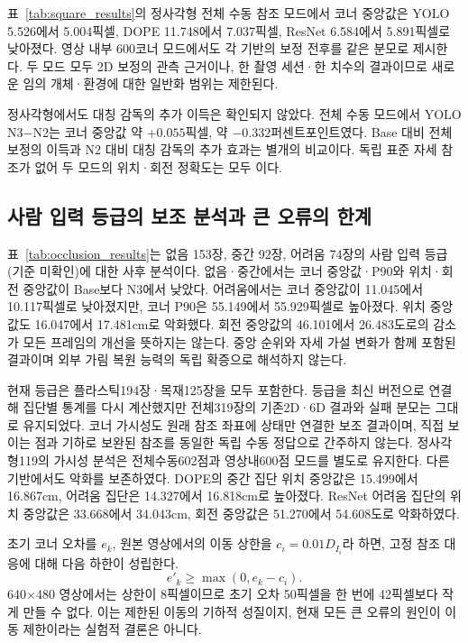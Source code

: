 표~\ref{tab:square_results}의 정사각형 전체 수동 참조 모드에서 코너 중앙값은 YOLO 5.526에서 5.004픽셀, DOPE 11.748에서 7.037픽셀, ResNet 6.584에서 5.891픽셀로 낮아졌다. 영상 내부 600코너 모드에서도 각 기반의 보정 전후를 같은 분모로 제시한다. 두 모드 모두 2D 보정의 관측 근거이나, 한 촬영 세션·한 치수의 결과이므로 새로운 임의 개체·환경에 대한 일반화 범위는 제한된다.


정사각형에서도 대칭 감독의 추가 이득은 확인되지 않았다. 전체 수동 모드에서 YOLO N3−N2는 코너 중앙값 약 $+0.055$픽셀, \pckten 약 $-0.332$퍼센트포인트였다. Base 대비 전체 보정의 이득과 N2 대비 대칭 감독의 추가 효과는 별개의 비교이다. 독립 표준 자세 참조가 없어 두 모드의 위치·회전 정확도는 모두 \notrun 이다.

\subsection{사람 입력 등급의 보조 분석과 큰 오류의 한계}
표~\ref{tab:occlusion_results}는 없음 153장, 중간 92장, 어려움 74장의 사람 입력 등급(기준 미확인)에 대한 사후 분석이다. 없음·중간에서는 코너 중앙값·P90와 위치·회전 중앙값이 Base보다 N3에서 낮았다. 어려움에서는 코너 중앙값이 11.045에서 10.117픽셀로 낮아졌지만, 코너 P90은 55.149에서 55.929픽셀로 높아졌다. 위치 중앙값도 16.047에서 17.481cm로 악화했다. 회전 중앙값의 46.101에서 26.483도로의 감소가 모든 프레임의 개선을 뜻하지는 않는다. 중앙 순위와 자세 가설 변화가 함께 포함된 결과이며 외부 가림 복원 능력의 독립 확증으로 해석하지 않는다.


현재 등급은 플라스틱194장·목재125장을 모두 포함한다. 등급을 최신 버전으로 연결해 집단별 통계를 다시 계산했지만 전체319장의 기존2D·6D 결과와 실패 분모는 그대로 유지되었다. 코너 가시성도 원래 참조 좌표에 상태만 연결한 보조 결과이며, 직접 보이는 점과 기하로 보완된 참조를 동일한 독립 수동 정답으로 간주하지 않는다. 정사각형119의 가시성 분석은 전체수동602점과 영상내600점 모드를 별도로 유지한다. 다른 기반에서도 악화를 보존하였다. DOPE의 중간 집단 위치 중앙값은 15.499에서 16.867cm, 어려움 집단은 14.327에서 16.818cm로 높아졌다. ResNet 어려움 집단의 위치 중앙값은 33.668에서 34.043cm, 회전 중앙값은 51.270에서 54.608도로 악화하였다. 

초기 코너 오차를 $e_k$, 원본 영상에서의 이동 상한을 $c_i=0.01D_{I_i}$라 하면, 고정 참조 대응에 대해 다음 하한이 성립한다.
\begin{equation}
 e'_k\geq\max(0,e_k-c_i).
\end{equation}
640$\times$480 영상에서는 상한이 8픽셀이므로 초기 오차 50픽셀을 한 번에 42픽셀보다 작게 만들 수 없다. 이는 제한된 이동의 기하적 성질이지, 현재 모든 큰 오류의 원인이 이동 제한이라는 실험적 결론은 아니다.

